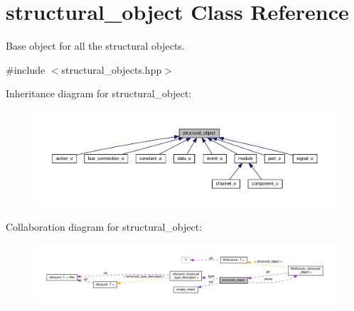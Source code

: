 \hypertarget{classstructural__object}{}\section{structural\+\_\+object Class Reference}
\label{classstructural__object}


Base object for all the structural objects.  




{\ttfamily \#include $<$structural\+\_\+objects.\+hpp$>$}



Inheritance diagram for structural\+\_\+object\+:
\nopagebreak
\begin{figure}[H]
\begin{center}
\leavevmode
\includegraphics[width=350pt]{d1/d74/classstructural__object__inherit__graph}
\end{center}
\end{figure}


Collaboration diagram for structural\+\_\+object\+:
\nopagebreak
\begin{figure}[H]
\begin{center}
\leavevmode
\includegraphics[width=350pt]{d3/df0/classstructural__object__coll__graph}
\end{center}
\end{figure}
